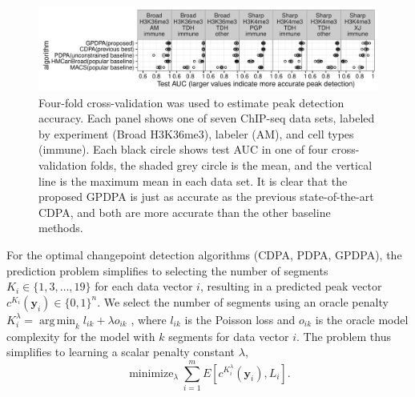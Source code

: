 \documentclass{article}
\DeclareMathOperator*{\argmin}{arg\,min}
\DeclareMathOperator*{\minimize}{minimize}
\begin{document}
\begin{figure}[t!]
  \centering
  \includegraphics[width=\textwidth]{figure-test-error-dots}
  \vskip -0.5cm
  \caption{Four-fold cross-validation 
was used to estimate peak detection accuracy. 
    Each panel shows one of seven ChIP-seq data sets, 
    labeled by experiment (Broad H3K36me3), 
    labeler (AM), and cell types (immune).
    Each black circle shows test AUC in one of four
    cross-validation folds, the shaded grey circle is the mean, and
    the vertical line is the maximum mean in each data set. It is
    clear that the proposed GPDPA is
    just as accurate as the previous state-of-the-art CDPA, and both are
    more accurate than the other baseline methods. 
  }
  \label{fig:test-error-dots}
\end{figure}

For the optimal changepoint detection algorithms (CDPA, PDPA, GPDPA),
the prediction problem simplifies to selecting the number of segments
$K_i\in \{1, 3,\dots, 19\}$ for each data vector $i$, resulting in a
predicted peak vector $c^{K_i}(\mathbf y_i)\in\{0,1\}^n$. We select the
number of segments using an oracle penalty
$K_i^\lambda=\argmin_k l_{ik} + \lambda o_{ik}$
\citep{cleynen2013segmentation}, where $l_{ik}$ is the Poisson loss and
$o_{ik}$ is the oracle model complexity for the model with $k$
segments for data vector $i$. 
The problem thus simplifies to learning a scalar
penalty constant $\lambda$,
\begin{equation}
  \label{eq:learn-lambda}
  \minimize_{\lambda}
  \sum_{i=1}^m E\left[
    c^{K_i^\lambda}(\mathbf y_i), 
    L_i\right].
\end{equation}



\end{document}
